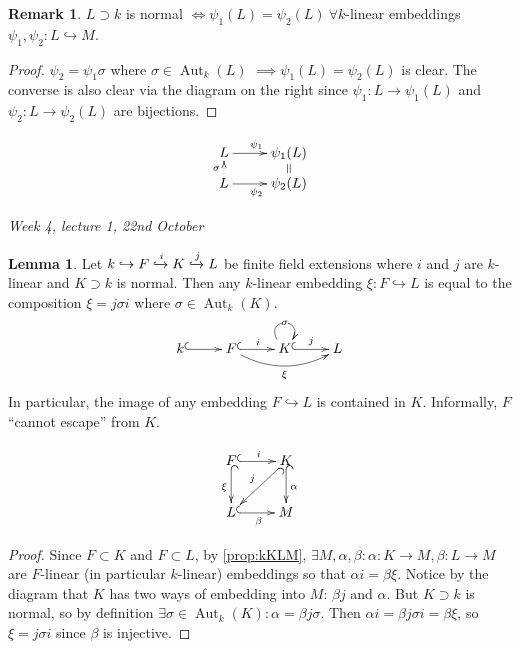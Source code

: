 \documentclass{article}
\newcommand{\Aut}{\operatorname{Aut}}
\theoremstyle{definition}
\newtheorem{lemma}[defn]{Lemma}
\newtheorem{remark}[defn]{Remark}
\begin{document}
\begin{remark}
$L\supset k$ is normal $\iff \psi_1(L)=\psi_2(L) \ \forall k$-linear embeddings $\psi_1,\psi_2:L\hookrightarrow M$.

\begin{minipage}{0.8\textwidth}
\begin{proof}
$\psi_2=\psi_1\sigma$ where $\sigma\in\Aut_k(L)$ $\implies\psi_1(L)=\psi_2(L)$ is clear. The converse is also clear via the diagram on the right since $\psi_1:L\rightarrow\psi_1(L)$ and $\psi_2:L\rightarrow\psi_2(L)$ are bijections.
\end{proof}
\end{minipage}
\begin{minipage}{0.2\textwidth}
\[
\xymatrix@R=0.5pc{
L\ar[r]^{\psi_1} & \psi_1(L)\ar@{=}[d] \\
L\ar[r]_{\psi_2}\ar@{.>}[u]^\sigma & \psi_2(L)
}
\]
\end{minipage}
\end{remark}

\begin{flushright}
\textit{Week 4, lecture 1, 22nd October}
\end{flushright}

\begin{lemma}
\label{lemma:noescape}
Let $k\hookrightarrow F\xhookrightarrow[]{i} K\xhookrightarrow[]{j} L$ be finite field extensions where $i$ and $j$ are $k$-linear and $K\supset k$ is normal. Then any $k$-linear embedding $\xi:F\hookrightarrow L$ is equal to the composition $\xi=j\sigma i$ where $\sigma\in\Aut_k(K)$.
\[
\xymatrix{
k\ar@{^{(}->}[r] & F\ar@{^{(}->}[r]^i \ar@/_1pc/[rr]_\xi & K\ar@{^{(}->}[r]^j\ar@(ul,ur)[]|{\sigma} & L
}
\]
In particular, the image of any embedding $F\hookrightarrow L$ is contained in $K$. Informally, $F$ ``cannot escape'' from $K$.
\end{lemma}
\begin{minipage}{0.2\textwidth}
\[
\xymatrix{
F\ar@{^{(}->}[r]^i \ar@{^{(}->}[d]_\xi & K\ar@{^{(}->}[d]^\alpha \ar@{^{(}->}[dl]_j \\
L\ar@{^{(}->}[r]_\beta & M
}
\]
\end{minipage}
\begin{minipage}{0.8\textwidth}
\begin{proof}
Since $F\subset K$ and $F\subset L$, by \ref{prop:kKLM}, $\exists M,\alpha,\beta:\alpha:K\rightarrow M,\beta:L\rightarrow M$ are $F$-linear (in particular $k$-linear) embeddings so that $\alpha i=\beta\xi$. Notice by the diagram that $K$ has two ways of embedding into $M$: $\beta j$ and $\alpha$.  But $K\supset k$ is normal, so by definition $\exists\sigma\in\Aut_k(K):\alpha=\beta j\sigma$. Then $\alpha i=\beta j\sigma i=\beta\xi$, so $\xi=j\sigma i$ since $\beta$ is injective.
\end{proof}
\end{minipage}
\end{document}
